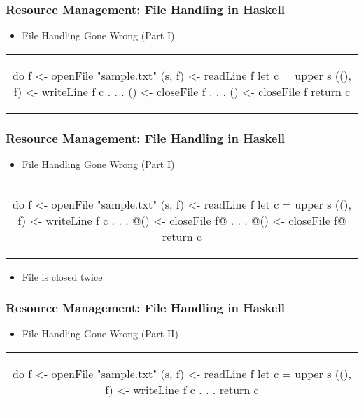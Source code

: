 \documentclass[xcolor={dvipsnames}, frame]{beamer}
\begin{document}
\begin{frame}[fragile]
  \frametitle{Resource Management: File Handling in Haskell}
  \begin{center}
    \begin{itemize}
    \item File Handling Gone Wrong (Part I)
    \end{itemize}
    \begin{tabular}[h]{c}
    \begin{haskell}
      do f  <- openFile "sample.txt"
         (s, f)  <- readLine f
         let c = upper s
         ((), f) <- writeLine f c
              .
              .
              .
         () <- closeFile f
              .
              .
              .
         () <- closeFile f
         return c
    \end{haskell}
    \end{tabular}
  \end{center}
\end{frame}

\begin{frame}[fragile]
  \frametitle{Resource Management: File Handling in Haskell}
  \begin{center}
    \begin{itemize}
    \item File Handling Gone Wrong (Part I)
    \end{itemize}
    \begin{tabular}[h]{c}
    \begin{haskell}
      do f  <- openFile "sample.txt"
         (s, f)  <- readLine f
         let c = upper s
         ((), f) <- writeLine f c
              .
              .
              .
        @() <- closeFile f@
              .
              .
              .
        @() <- closeFile f@
         return c
    \end{haskell}
    \end{tabular}
    \begin{itemize}
    \item File is closed twice
    \end{itemize}
  \end{center}
\end{frame}

\begin{frame}[fragile]
  \frametitle{Resource Management: File Handling in Haskell}
  \begin{center}

  \begin{itemize}
  \item File Handling Gone Wrong (Part II)
  \end{itemize}
  \begin{tabular}[h]{c}
    \begin{haskell}
    do f  <- openFile "sample.txt"
       (s, f)  <- readLine f
       let c = upper s
       ((), f) <- writeLine f c
           .
           .
           .
       return c
     \end{haskell}
  \end{tabular}

\end{center}
\end{frame}
\end{document}
